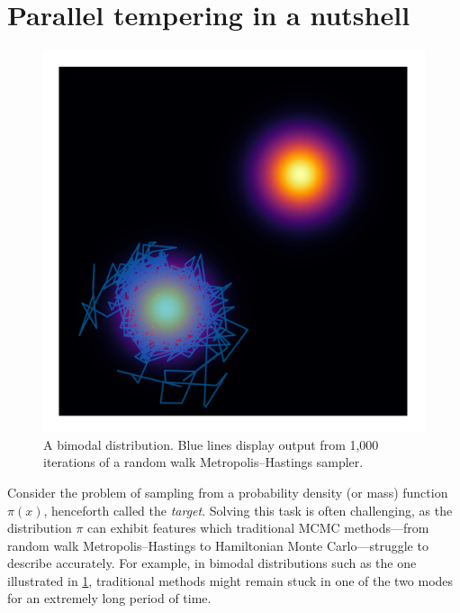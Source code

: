 \section{Parallel tempering in a nutshell}

\begin{figure}[t]
  \centering
    \includegraphics[width=0.5\linewidth]{../img/bimodal.pdf}
    \caption{A bimodal distribution. Blue lines display output 
    from 1,000 iterations of a random walk Metropolis--Hastings sampler.}
    \label{fig:bimodal}
\end{figure}

Consider the problem of sampling from a probability density (or mass) function
$\pi(x)$, henceforth called the \emph{target}. Solving this task is often 
challenging, as the 
distribution $\pi$ can exhibit features which traditional MCMC methods---from
random walk Metropolis--Hastings to Hamiltonian Monte Carlo---struggle to
describe accurately. For example, in bimodal distributions such as the one 
illustrated in \cref{fig:bimodal}, traditional methods might remain stuck in one 
of the two modes for an extremely long period of time.

